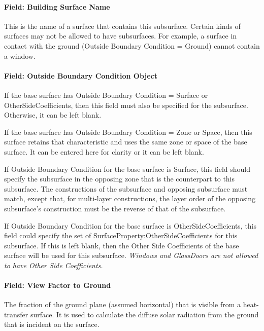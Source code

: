 \paragraph{Field: Building Surface Name}\label{field-building-surface-name-6}

This is the name of a surface that contains this subsurface. Certain kinds of surfaces may not be allowed to have subsurfaces. For example, a surface in contact with the ground (Outside Boundary Condition = Ground) cannot contain a window.

\paragraph{Field: Outside Boundary Condition Object}\label{field-outside-boundary-condition-object-10}

If the base surface has Outside Boundary Condition = Surface or OtherSideCoefficients, then this field must also be specified for the subsurface. Otherwise, it can be left blank.

If the base surface has Outside Boundary Condition = Zone or Space, then this surface retains that characteristic and uses the same zone or space of the base surface. It can be entered here for clarity or it can be left blank.

If Outside Boundary Condition for the base surface is Surface, this field should specify the subsurface in the opposing zone that is the counterpart to this subsurface. The constructions of the subsurface and opposing subsurface must match, except that, for multi-layer constructions, the layer order of the opposing subsurface's construction must be the reverse of that of the subsurface.

If Outside Boundary Condition for the base surface is OtherSideCoefficients, this field could specify the set of \hyperref[surfacepropertyothersidecoefficients]{SurfaceProperty:OtherSideCoefficients} for this subsurface. If this is left blank, then the Other Side Coefficients of the base surface will be used for this subsurface. \emph{Windows and GlassDoors are not allowed to have Other Side Coefficients.}

\paragraph{Field: View Factor to Ground}\label{field-view-factor-to-ground-4}

The fraction of the ground plane (assumed horizontal) that is visible from a heat-transfer surface. It is used to calculate the diffuse solar radiation from the ground that is incident on the surface.

